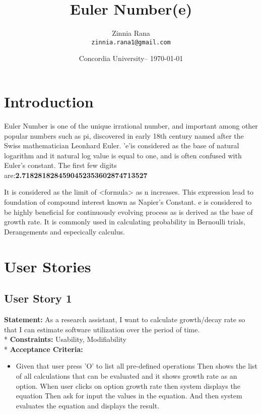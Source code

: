 \documentclass{article}
\title{Euler Number(e)} %
\author{Zinnia Rana\\ \texttt{zinnia.rana1@gmail.com}} %
\date{Concordia University-- \today} %
\begin{document}
\maketitle %


\section*{Introduction} %

Euler Number is one of the unique irrational number, and important among other popular numbers such as pi, discovered in early 18th century  named after the Swiss mathematician Leonhard Euler. 'e'is considered as the base of natural logarithm and it natural log value is equal to one, and is often confused with Euler's constant. The first few digits are:\textbf{2.7182818284590452353602874713527} 


It is considered as the limit of <formula> as n increases. This expression lead to foundation of compound interest known as Napier's Constant. e is considered to be highly beneficial for continuously evolving process as is derived as the base of growth rate. It is commonly used in calculating probability in Bernoulli trials, Derangements and especically calculus.

\section*{User Stories}  %

\subsection{User Story 1} %

\noindent \textbf {Statement: }As a research assistant, I want to calculate growth/decay rate so that I can estimate software utilization over the period of time. \\*
\newline 
\noindent \textbf {Constraints:}  Usability, Modifiability\\*
\newline
\textbf{Acceptance Criteria: } 
\begin{itemize}
  \item Given that user press 'O' to list all pre-defined operations \newline Then shows the list of all calculations that can be evaluated and it shows growth rate as an option.   
  \newline When user clicks on option growth rate then system displays the equation
  \newline Then ask for input the values in the equation.
  \newline And then system evaluates the equation and displays the result.\newline
\end{itemize}
\end{document}
